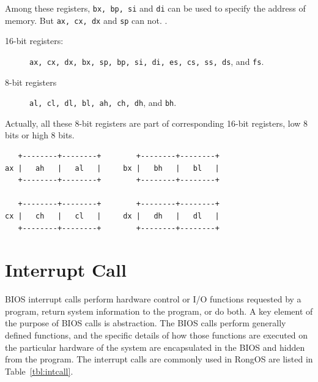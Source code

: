 \documentclass{swfcthesis}
\begin{document}
Among these registers, \texttt{bx, bp, si} and \texttt{di} can be used to specify the
address of memory. But \texttt{ax, cx, dx} and \texttt{sp} can not.  .
\begin{description}
\item[16-bit registers:] \texttt{ax, cx, dx, bx, sp, bp, si, di, es, cs, ss, ds}, and \texttt{fs}.
\item[8-bit registers] \texttt{al, cl, dl, bl, ah, ch, dh}, and \texttt{bh}.
\end{description}
Actually, all these 8-bit registers are part of corresponding 16-bit registers, low 8 bits
or high 8 bits.

\begin{verbatim}
   +--------+--------+        +--------+--------+
ax |   ah   |   al   |     bx |   bh   |   bl   |
   +--------+--------+        +--------+--------+

   +--------+--------+        +--------+--------+
cx |   ch   |   cl   |     dx |   dh   |   dl   |
   +--------+--------+        +--------+--------+
\end{verbatim}

\section{Interrupt Call}

BIOS interrupt calls perform hardware control or I/O functions requested by a program,
return system information to the program, or do both. A key element of the purpose of BIOS
calls is abstraction. The BIOS calls perform generally defined functions, and the specific
details of how those functions are executed on the particular hardware of the system are
encapsulated in the BIOS and hidden from the program\cite{wiki:bios-int}. The interrupt
calls are commonly used in RongOS are listed in Table~\ref{tbl:intcall}.
\end{document}
